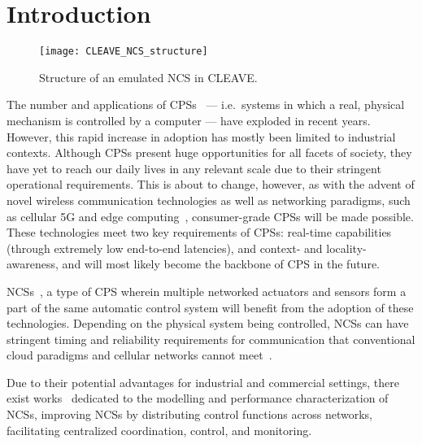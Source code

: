 \section{Introduction}\label{sec:intro}

\begin{figure*}
    \centering
    \texttt{[image: CLEAVE\_NCS\_structure]}
    \caption{
        Structure of an emulated \acl*{NCS} in \acs*{CLEAVE}.
    }\label{fig:cleave:ncs:struct}
\end{figure*}

The number and applications of \acp{CPS}~\cite{Rajkumar2010CPS} --- i.e.\ systems in which a real, physical mechanism is controlled by a computer --- have exploded in recent years.
However, this rapid increase in adoption has mostly been limited to industrial contexts.
Although \acp{CPS} present huge opportunities for all facets of society, they have yet to reach our daily lives in any relevant scale due to their stringent operational requirements.
This is about to change, however, as with the advent of novel wireless communication technologies as well as networking paradigms, such as cellular 5G and edge computing~\cite{Satya2017Emergence}, consumer-grade \acp{CPS} will be made possible.
These technologies meet two key requirements of \acp{CPS}: real-time capabilities (through extremely low end-to-end latencies), and context- and locality-awareness, and will most likely become the backbone of \ac{CPS} in the future.

\acp{NCS}~\cite{Gupta2010NCSOverview}, a type of \ac{CPS} wherein multiple networked actuators and sensors form a part of the same automatic control system will benefit from the adoption of these technologies.
Depending on the physical system being controlled, \acp{NCS} can have stringent timing and reliability requirements for communication that conventional cloud paradigms and cellular networks cannot meet~\cite{Wan2020Efficient}.

Due to their potential advantages for industrial and commercial settings, there exist works~\cite{Zhang2016Survey} dedicated to the modelling and performance characterization of \acp{NCS}, improving NCSs by distributing control functions across networks, facilitating centralized coordination, control, and monitoring.

